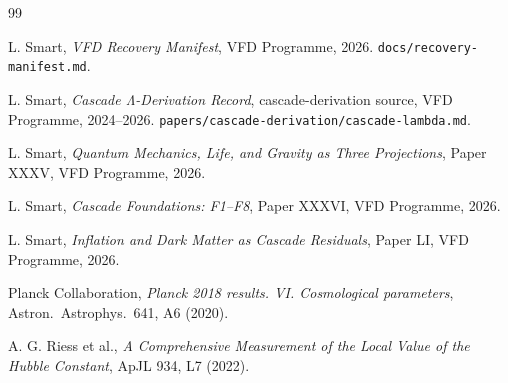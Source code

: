 \documentclass[12pt]{article}
\theoremstyle{definition}
\theoremstyle{remark}
\begin{document}

\begin{thebibliography}{99}

 L. Smart, \emph{VFD Recovery Manifest}, VFD Programme, 2026. \texttt{docs/recovery-manifest.md}.

 L. Smart, \emph{Cascade Λ-Derivation Record}, cascade-derivation source, VFD Programme, 2024--2026. \texttt{papers/cascade-derivation/cascade-lambda.md}.

 L. Smart, \emph{Quantum Mechanics, Life, and Gravity as Three Projections}, Paper XXXV, VFD Programme, 2026.

 L. Smart, \emph{Cascade Foundations: F1--F8}, Paper XXXVI, VFD Programme, 2026.

 L. Smart, \emph{Inflation and Dark Matter as Cascade Residuals}, Paper LI, VFD Programme, 2026.

 Planck Collaboration, \emph{Planck 2018 results. VI. Cosmological parameters}, Astron.\ Astrophys.\ 641, A6 (2020).

 A. G. Riess et al., \emph{A Comprehensive Measurement of the Local Value of the Hubble Constant}, ApJL 934, L7 (2022).

\end{thebibliography}
\end{document}

